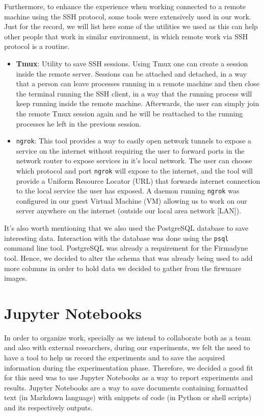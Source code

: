 Furthermore, to enhance the experience when working connected to a remote machine using the SSH protocol, some tools were extensively used in our work. Just for the record, we will list here some of the utilities we used as this can help other people that work in similar environment, in which remote work via SSH protocol is a routine.

\begin{itemize}
    \item \textbf{Tmux}: Utility to save SSH sessions. Using Tmux one can create a session inside the remote server. Sessions can be attached and detached, in a way that a person can leave processes running in a remote machine and then close the terminal running the SSH client, in a way that the running process will keep running inside the remote machine. Afterwards, the user can simply join the remote Tmux session again and he will be reattached to the running processes he left in the previous session.
    
    \item {\tt ngrok}: This tool provides a way to easily open network tunnels to expose a service on the internet without requiring the user to forward ports in the network router to expose services in it's local network. The user can choose which protocol and port {\tt ngrok} will expose to the internet, and the tool will provide a Uniform Resource Locator (URL) that forwards internet connection to the local service the user has exposed. A daemon running {\tt ngrok} was configured in our guest Virtual Machine (VM) allowing us to work on our server anywhere on the internet (outside our local area network [LAN]).
\end{itemize}

It's also worth mentioning that we also used the PostgreSQL database to save interesting data. Interaction with the database was done using the {\tt psql} command line tool. PostgreSQL was already a requirement for the Firmadyne~\cite{firmadyne} tool. Hence, we decided to alter the schema that was already being used to add more columns in order to hold data we decided to gather from the firwmare images.

\section{Jupyter Notebooks}

In order to organize work, specially as we intend to collaborate both as a team and also with external researchers, during our experiments, we felt the need to have a tool to help us record the experiments and to save the acquired information during the experimentation phase. Therefore, we decided a good fit for this need was to use Jupyter Notebooks as a way to report experiments and results. Jupyter Notebooks are a way to save documents containing formatted text (in Markdown language) with snippets of code (in Python or shell scripts) and its respectively outputs.

